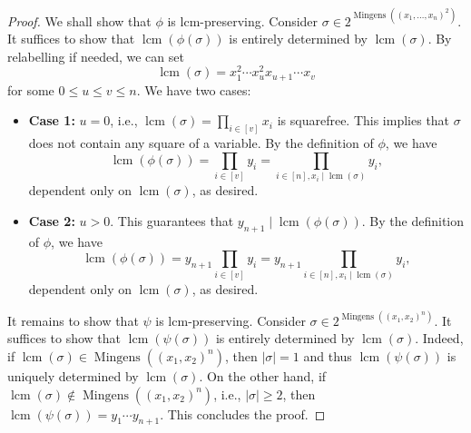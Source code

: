 \documentclass[reqno]{amsart}
\DeclareMathOperator{\lcm}{lcm}
\DeclareMathOperator{\mingens}{Mingens}
\theoremstyle{definition}
\theoremstyle{remark}
\numberwithin{equation}{section}
\begin{document}
\begin{proof}


    We shall show that $\phi$ is lcm-preserving. Consider $\sigma\in 2^{\mingens((x_1,\dots, x_n)^2)}$. It suffices to show that $\lcm(\phi(\sigma))$ is entirely determined by $\lcm(\sigma)$.  By relabelling if needed, we can set
    \[
    \lcm(\sigma)=x_{1}^2\cdots x_u^2x_{u+1}\cdots x_v
    \]
    for some $0\leq u\leq v\leq n$. We have two cases:
    \begin{itemize}
        \item \textbf{Case 1:} $u=0$, i.e., $\lcm(\sigma)=\prod_{i\in [v]}x_i$ is squarefree. This implies that $\sigma$ does not contain any square of a variable. By the definition of $\phi$, we have
        \[
        \lcm(\phi(\sigma))= \prod_{i\in [v]} y_i= \prod_{i\in [n], x_i\mid \lcm(\sigma)} y_i,
         \]
         dependent only on $\lcm(\sigma)$, as desired.
         \item \textbf{Case 2:} $u>0$. This guarantees that $y_{n+1}\mid \lcm(\phi(\sigma))$. By the definition of $\phi$, we have
        \[
        \lcm(\phi(\sigma))= y_{n+1} \prod_{i\in [v]} y_i= y_{n+1}\prod_{i\in [n], x_i\mid \lcm(\sigma)} y_i,
         \]
         dependent only on $\lcm(\sigma)$, as desired.
    \end{itemize}
    It remains to show that $\psi$ is lcm-preserving. Consider $\sigma\in 2^{\mingens((x_1, x_2)^n)}$. It suffices to show that $\lcm(\psi(\sigma))$ is entirely determined by $\lcm(\sigma)$. Indeed, if $\lcm(\sigma)\in \mingens((x_1, x_2)^n)$, then $|\sigma|=1$ and thus $\lcm(\psi(\sigma))$ is uniquely determined by $\lcm(\sigma)$. On the other hand, if $\lcm(\sigma)\notin \mingens((x_1, x_2)^n)$, i.e., $|\sigma|\geq 2$, then $\lcm(\psi(\sigma))=y_1\cdots y_{n+1}$. This concludes the proof.
\end{proof}
\end{document}
